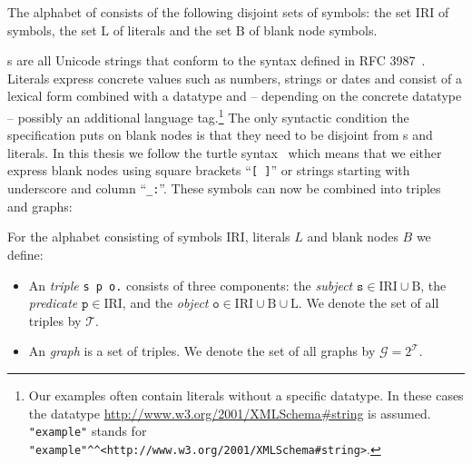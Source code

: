 \begin{definition}\label{rdfsymbs}
The alphabet of \rdf consists of the following disjoint sets of symbols:
the set $\mathrm{IRI}$ of \iri symbols, the set $\mathrm{L}$ of literals and the set $\mathrm{B}$ of blank node symbols. 
\end{definition}

\iri{}s are all Unicode strings that conform to the syntax defined in RFC 3987~\cite{iri}. 
Literals express concrete values such as numbers, strings or dates and consist of a lexical form combined with a datatype \iri and -- depending on the concrete datatype -- possibly 
an additional
language 
tag.\footnote{Our examples often contain literals without a specific datatype. In these cases the datatype  \url{http://www.w3.org/2001/XMLSchema\#string} is assumed.
\texttt{"example"} stands for \texttt{"example"\textasciicircum\textasciicircum<http://www.w3.org/2001/XMLSchema\#string>}.}
The only syntactic condition the \rdf specification puts on blank nodes is that they need to be disjoint from \iri{}s and literals.
In this thesis we follow the turtle syntax~\cite{turtle} which means that we
either  express blank nodes using square brackets ``\texttt{[~]}'' or strings starting with underscore and column ``\texttt{\_:}''.
These symbols can now be combined into triples and graphs:

\begin{definition}\label{rdftrips}
 For the \rdf alphabet consisting of \iri symbols $\mathrm{IRI}$, literals $L$ and blank nodes $B$ we define:
\begin{itemize}
\item An \emph{\rdf triple} \texttt{s p o.} consists of three components: the \emph{subject}  $\texttt{s}\in \mathrm{IRI}\cup\mathrm{B}$, 
   the \emph{predicate} $\texttt{p}\in\mathrm{IRI}$, and
   the \emph{object} $\texttt{o}\in\mathrm{IRI}\cup\mathrm{B}\cup\mathrm{L}$. We denote the set of all \rdf triples by $\mathcal{T}$.
\item An \emph{\rdf graph} is a set of \rdf triples.   We denote the set of all \rdf graphs by $\mathcal{G}=2^\mathcal{T}$.
\end{itemize}
\end{definition}

